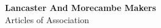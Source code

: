 


\begin{titlepage}
\begin{center}
{\bf \LARGE Lancaster And Morecambe Makers}\\[36pt]
{\Large Articles of Association}

\vfill

\end{center}
\end{titlepage}


